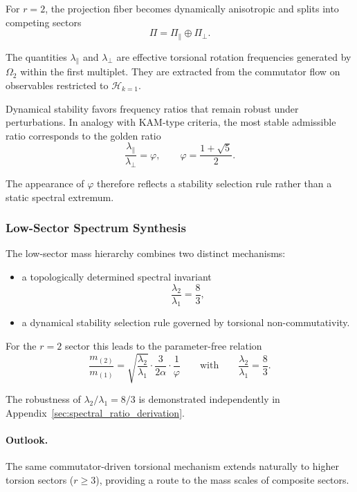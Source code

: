     For $r=2$, the projection fiber becomes dynamically anisotropic
    and splits into competing sectors
    \[
      \Pi=\Pi_{\parallel}\oplus\Pi_{\perp}.
    \]

    The quantities $\lambda_{\parallel}$ and $\lambda_{\perp}$ are
    effective torsional rotation frequencies generated by $\Omega_2$
    within the first multiplet.
    They are extracted from the commutator flow on observables
    restricted to $\mathcal{H}_{k=1}$.

    Dynamical stability favors frequency ratios that remain robust
    under perturbations.
    In analogy with KAM-type criteria, the most stable admissible
    ratio corresponds to the golden ratio
    \begin{equation}
      \frac{\lambda_{\parallel}}{\lambda_{\perp}}
      = \varphi ,
      \qquad
      \varphi=\frac{1+\sqrt5}{2}.
      \label{eq:beta-golden}
    \end{equation}

    The appearance of $\varphi$ therefore reflects a stability
    selection rule rather than a static spectral extremum.

  \subsubsection*{Low-Sector Spectrum Synthesis}
    \label{sec:leptonic-synthesis}

    The low-sector mass hierarchy combines two distinct mechanisms:

    \begin{itemize}
      \item a topologically determined spectral invariant
      \[
        \frac{\lambda_2}{\lambda_1}=\frac{8}{3},
      \]

      \item a dynamical stability selection rule governed by
      torsional non-commutativity.
    \end{itemize}

    For the $r=2$ sector this leads to the parameter-free relation
    \begin{equation}
      \boxed{
        \frac{m_{(2)}}{m_{(1)}}
        = \sqrt{\frac{\lambda_{2}}{\lambda_{1}}}
        \cdot \frac{3}{2\alpha}
        \cdot \frac{1}{\varphi}
      }
      \qquad\text{with}\qquad
      \frac{\lambda_2}{\lambda_1}=\frac{8}{3}.
      \label{eq:muon-ratio-final}
    \end{equation}

    The robustness of $\lambda_2/\lambda_1=8/3$ is demonstrated
    independently in Appendix~\ref{sec:spectral_ratio_derivation}.

    \paragraph*{Outlook.}
      The same commutator-driven torsional mechanism extends naturally
      to higher torsion sectors ($r\ge 3$), providing a route to the
      mass scales of composite sectors.
